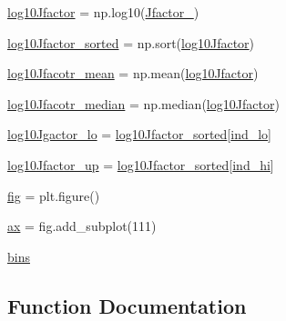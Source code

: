 \begin{DoxyCompactItemize}
\item 
\hyperlink{namespacejfactor_a9a89658d06c0c77e0c11e4372ef88f4f}{log10\+Jfactor} = np.\+log10(\hyperlink{namespacejfactor_adfab35ee4763d30c17fe3a8791394e44}{Jfactor\+\_\+})
\item 
\hyperlink{namespacejfactor_a81a38976b26f5865c633d0d078ab7796}{log10\+Jfactor\+\_\+sorted} = np.\+sort(\hyperlink{namespacejfactor_a9a89658d06c0c77e0c11e4372ef88f4f}{log10\+Jfactor})
\item 
\hyperlink{namespacejfactor_a1e5820e27e0fea1ecb631861940d56c9}{log10\+Jfacotr\+\_\+mean} = np.\+mean(\hyperlink{namespacejfactor_a9a89658d06c0c77e0c11e4372ef88f4f}{log10\+Jfactor})
\item 
\hyperlink{namespacejfactor_a2d1ea785abc603943b2645a312197359}{log10\+Jfacotr\+\_\+median} = np.\+median(\hyperlink{namespacejfactor_a9a89658d06c0c77e0c11e4372ef88f4f}{log10\+Jfactor})
\item 
\hyperlink{namespacejfactor_a9f023e9540cdb0cd16e23b84817d50dd}{log10\+Jgactor\+\_\+lo} = \hyperlink{namespacejfactor_a81a38976b26f5865c633d0d078ab7796}{log10\+Jfactor\+\_\+sorted}\mbox{[}\hyperlink{namespacejfactor_aaf9c1c756ff45c03f48ccc922857360f}{ind\+\_\+lo}\mbox{]}
\item 
\hyperlink{namespacejfactor_a17eab489ecdc2fcda0ff105b820f38a4}{log10\+Jfactor\+\_\+up} = \hyperlink{namespacejfactor_a81a38976b26f5865c633d0d078ab7796}{log10\+Jfactor\+\_\+sorted}\mbox{[}\hyperlink{namespacejfactor_a449b6d5eec9600e32c2388268c367957}{ind\+\_\+hi}\mbox{]}
\item 
\hyperlink{namespacejfactor_a543bb58e72396959da8abdb03baad5eb}{fig} = plt.\+figure()
\item 
\hyperlink{namespacejfactor_a768b65ab10ab4bc6a8783ad4fd176789}{ax} = fig.\+add\+\_\+subplot(111)
\item 
\hyperlink{namespacejfactor_a819ba1bdb19519796c682583f8b5971f}{bins}
\end{DoxyCompactItemize}


\subsection{Function Documentation}
\mbox{\label{namespacejfactor_afb33d5b3499565b8b7c23e15f3615ec0}} 
